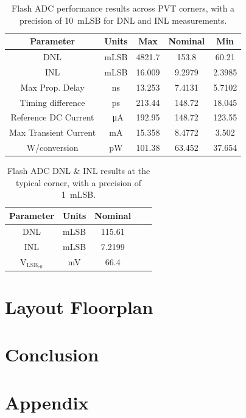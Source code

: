 \documentclass[11pt,letterpaper]{article}
\begin{document}
\begin{table}[]
    \centering
    \begin{tabular}{ccccc}
    \toprule
        Parameter & Units & Max & Nominal & Min \\
    \midrule
        DNL & mLSB & 4821.7 & 153.8 & 60.21 \\
        INL & mLSB & 16.009 & 9.2979 & 2.3985 \\
        Max Prop. Delay & ns & 13.253 & 7.4131 & 5.7102 \\
        Timing difference & ps & 213.44 & 148.72 & 18.045 \\
        Reference DC Current & \qty{}{\uA} & 192.95 & 148.72 & 123.55 \\
        Max Transient Current & mA & 15.358 & 8.4772 & 3.502 \\
        W/conversion & pW & 101.38 & 63.452 & 37.654 \\
    \bottomrule
        
    \end{tabular}
    \caption{Flash ADC performance results across PVT corners, with a precision of \qty{10}{mLSB} for DNL and INL measurements.}\label{tab:corners_sch}
\end{table}

\begin{table}[]
    \centering
    \begin{tabular}{ccccc}
    \toprule
        Parameter & Units & Nominal \\
    \midrule
        DNL & mLSB & 115.61 \\
        INL & mLSB & 7.2199 \\
        \(\mathrm{V_{LSB_{eff}}}\) & mV & 66.4 \\
    \bottomrule
        
    \end{tabular}
    \caption{Flash ADC DNL \& INL results at the typical corner, with a precision of \qty{1}{mLSB}.}\label{tab:typ_sch}
\end{table}

\section{Layout Floorplan}

\section{Conclusion}

\newpage




\newpage
\section*{Appendix}
\end{document}
